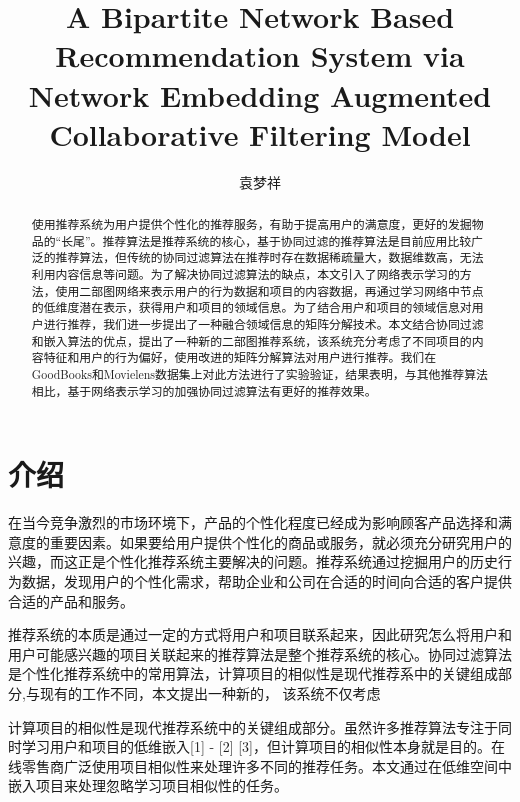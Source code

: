 \documentclass[lang=cn,11pt]{elegantpaper}
\title{A Bipartite Network Based Recommendation System via Network Embedding Augmented Collaborative Filtering Model }
\author{袁梦祥}
\institute{安徽大学大数据与云服务工程实验室}
\date{}
\begin{document}
\maketitle

\begin{abstract}
\noindent 使用推荐系统为用户提供个性化的推荐服务，有助于提高用户的满意度，更好的发掘物品的“长尾”。推荐算法是推荐系统的核心，基于协同过滤的推荐算法是目前应用比较广泛的推荐算法，但传统的协同过滤算法在推荐时存在数据稀疏量大，数据维数高，无法利用内容信息等问题。为了解决协同过滤算法的缺点，本文引入了网络表示学习的方法，使用二部图网络来表示用户的行为数据和项目的内容数据，再通过学习网络中节点的低维度潜在表示，获得用户和项目的领域信息。为了结合用户和项目的领域信息对用户进行推荐，我们进一步提出了一种融合领域信息的矩阵分解技术。本文结合协同过滤和嵌入算法的优点，提出了一种新的二部图推荐系统，该系统充分考虑了不同项目的内容特征和用户的行为偏好，使用改进的矩阵分解算法对用户进行推荐。我们在GoodBooks和Movielens数据集上对此方法进行了实验验证，结果表明，与其他推荐算法相比，基于网络表示学习的加强协同过滤算法有更好的推荐效果。
\end{abstract}


\section{介绍}

在当今竞争激烈的市场环境下，产品的个性化程度已经成为影响顾客产品选择和满意度的重要因素。如果要给用户提供个性化的商品或服务，就必须充分研究用户的兴趣，而这正是个性化推荐系统主要解决的问题。推荐系统通过挖掘用户的历史行为数据，发现用户的个性化需求，帮助企业和公司在合适的时间向合适的客户提供合适的产品和服务。

推荐系统的本质是通过一定的方式将用户和项目联系起来，因此研究怎么将用户和用户可能感兴趣的项目关联起来的推荐算法是整个推荐系统的核心。协同过滤算法是个性化推荐系统中的常用算法，计算项目的相似性是现代推荐系中的关键组成部分,与现有的工作不同，本文提出一种新的， 该系统不仅考虑

计算项目的相似性是现代推荐系统中的关键组成部分。虽然许多推荐算法专注于同时学习用户和项目的低维嵌入[1] - [2] [3]，但计算项目的相似性本身就是目的。在线零售商广泛使用项目相似性来处理许多不同的推荐任务。本文通过在低维空间中嵌入项目来处理忽略学习项目相似性的任务。
\end{document}
